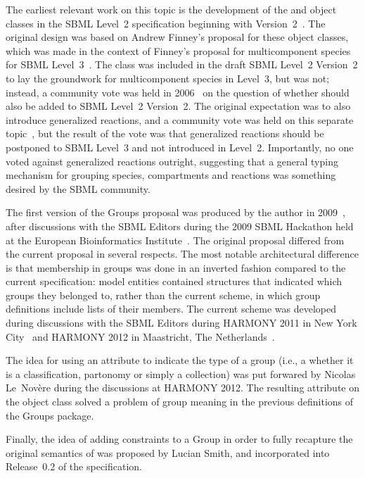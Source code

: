 The earliest relevant work on this topic is the development of the \CompartmentType and \SpeciesType object classes in the SBML Level~2 specification beginning with Version~2~\citep{l2v2}. The original design was based on Andrew Finney's proposal for these object classes, which was made in the context of Finney's proposal for multicomponent species for SBML Level~3~\citep{finney_2004}. The \SpeciesType class was included in the draft SBML Level~2 Version~2 to lay the groundwork for multicomponent species in Level~3, but  was not; instead, a community vote was held in 2006~\citep{vote_2006} on the question of whether  should also be added to SBML Level~2 Version~2. The original expectation was to also introduce generalized reactions, and a community vote was held on this separate topic~\citep{vote_2006b}, but the result of the vote was that generalized reactions should be postponed to SBML Level~3 and not introduced in Level~2. Importantly, no one voted against generalized reactions outright, suggesting that a general typing mechanism for grouping species, compartments and reactions was something desired by the SBML community.

The first version of the Groups proposal was produced by the author in 2009~\citep{hucka_2009}, after discussions with the SBML Editors during the 2009 SBML Hackathon held at the European Bioinformatics Institute~\citep{sbml_hackathon_2009}.  The original proposal differed from the current proposal in several respects. The most notable architectural difference is that membership in groups was done in an inverted fashion compared to the current specification: model entities contained structures that indicated which groups they belonged to, rather than the current scheme, in which group definitions include lists of their members.  The current scheme was developed during discussions with the SBML Editors during HARMONY 2011 in New York City~\citep{harmony_2011} and HARMONY 2012 in Maastricht, The Netherlands~\citep{harmony_2012}.

The idea for using an attribute to indicate the type of a group (i.e., a whether it is a classification, partonomy or simply a collection) was put forwared by Nicolas Le~Nov\`{e}re during the discussions at HARMONY 2012.  The resulting attribute  on the \Group object class solved a problem of group meaning in the previous definitions of the Groups package.

Finally, the idea of adding constraints to a Group in order to fully recapture the original semantics of \SpeciesType was proposed by Lucian Smith, and incorporated into Release~0.2 of the specification.
